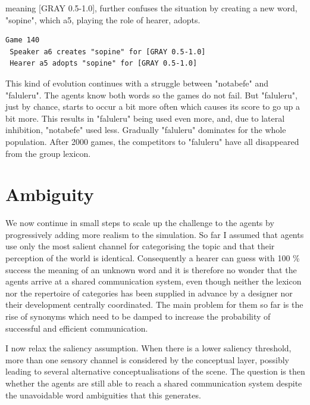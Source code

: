 meaning [GRAY 0.5-1.0], further confuses the situation by 
creating a new word, "sopine", which {\bfshape  a5}, playing
the role of hearer, adopts. 
\begin{verbatim}
Game 140
 Speaker a6 creates "sopine" for [GRAY 0.5-1.0]
 Hearer a5 adopts "sopine" for [GRAY 0.5-1.0]
\end{verbatim}
This kind of evolution continues with a struggle between 
"notabefe" and "faluleru". The agents know both 
words so the games do not fail. But "faluleru", 
just by chance, starts to occur a bit more often
which causes its score to go up a bit more. 
This results in "faluleru" being used even more, 
and, due to lateral inhibition, "notabefe" used 
less. Gradually "faluleru" dominates for 
the whole population. 
After 2000 games, the competitors to "faluleru" have 
all disappeared from the group lexicon. 

\section{Ambiguity} 

We now continue in small steps to scale up the
challenge to the agents by progressively 
adding more realism to the simulation. So far I 
assumed that agents use only 
the most salient channel for categorising the topic
and that their perception of the world is identical.
Consequently a hearer can guess with 100 \% success the
meaning of an unknown word and 
it is therefore no wonder that the agents arrive at a 
shared communication system, 
even though neither the lexicon nor the repertoire
of categories has been supplied in advance by a 
designer nor their development centrally
coordinated. The main problem for them so far is 
the rise of synonyms which need to be damped to 
increase the probability of successful and 
efficient communication. 

I now relax the saliency assumption. When 
there is a lower saliency threshold, more than one
sensory channel is considered by the conceptual 
layer, possibly leading to several alternative
conceptualisations of the scene. The question is 
then whether the agents are still able to reach 
a shared communication system despite the unavoidable
word ambiguities that this generates. 

